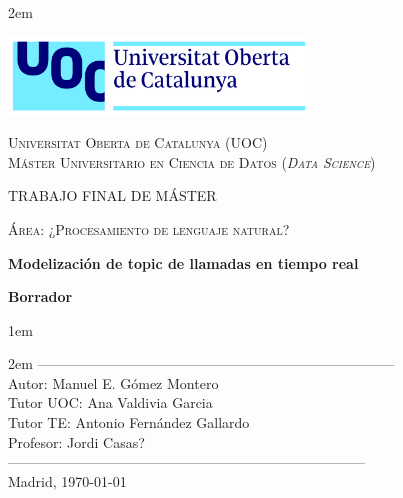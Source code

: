 \newpage
\thispagestyle{empty}

\baselineskip 2em


\centerline{\includegraphics[width=0.6\textwidth]{images/UOC-logo}}
\begin{center}
\textsc{Universitat Oberta de Catalunya (UOC) \\
 Máster Universitario en Ciencia de Datos (\textit{Data Science})\\}


\vspace*{1.5cm}

\textsc{\Large TRABAJO FINAL DE MÁSTER}

\vspace*{0.5cm}

\textsc{\large Área: ¿Procesamiento de lenguaje natural?}



\vspace*{2.0cm}

\textbf{\Large Modelización de topic de llamadas en tiempo real}

\textbf{\large Borrador}

\vspace{2.5cm}
\baselineskip 1em

\baselineskip 2em
-----------------------------------------------------------------------------\\
Autor:      Manuel E. Gómez Montero\\
Tutor UOC:      Ana Valdivia Garcia\\
Tutor TE:      Antonio Fernández Gallardo\\
Profesor:   Jordi Casas?\\
-----------------------------------------------------------------------------\\
\vspace*{1.5cm}
Madrid, \today

\end{center}

\newpage
\pagestyle{empty}
\hfill
